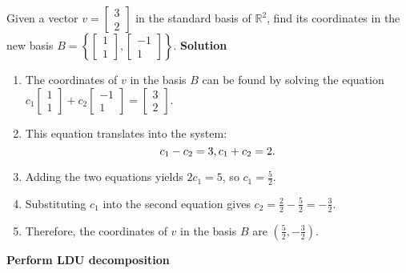 \documentclass[8pt, a4paper, landscape]{extarticle}
\begin{document}
\begin{multicols*}{4}
  Given a vector $v = \begin{bmatrix} 3 \\ 2 \end{bmatrix}$ in the standard basis of $\mathbb{R}^2$, find its coordinates in the new basis $B = \left\{ \begin{bmatrix} 1 \\ 1 \end{bmatrix}, \begin{bmatrix} -1 \\ 1 \end{bmatrix} \right\}$.
  \textbf{Solution}
  \begin{enumerate}
    \item The coordinates of $v$ in the basis $B$ can be found by solving the equation $c_1\begin{bmatrix} 1 \\ 1 \end{bmatrix} + c_2\begin{bmatrix} -1 \\ 1 \end{bmatrix} = \begin{bmatrix} 3 \\ 2 \end{bmatrix}$.
    \item This equation translates into the system:
          \[
            c_1 - c_2 = 3, \\
            c_1 + c_2 = 2.
          \]
    \item Adding the two equations yields $2c_1 = 5$, so $c_1 = \frac{5}{2}$.
    \item Substituting $c_1$ into the second equation gives $c_2 = \frac{2}{2} - \frac{5}{2} = -\frac{3}{2}$.
    \item Therefore, the coordinates of $v$ in the basis $B$ are $\left(\frac{5}{2}, -\frac{3}{2}\right)$.
  \end{enumerate}


  \textbf{Perform LDU decomposition}


\end{multicols*}
\end{document}
